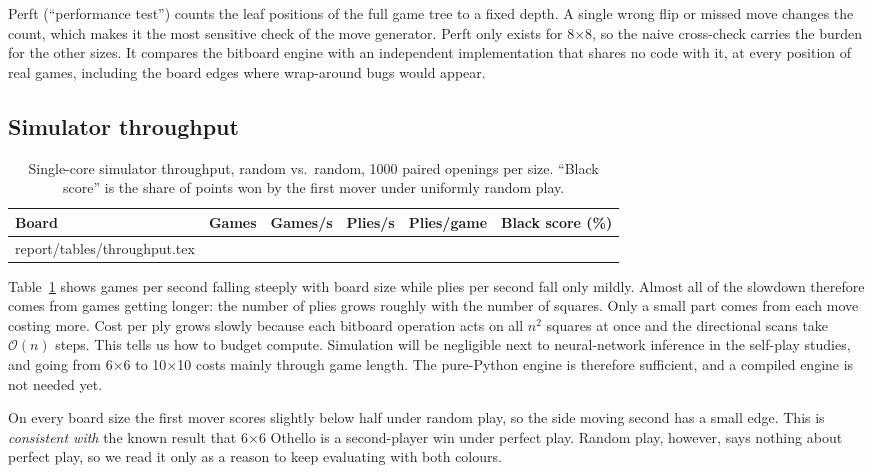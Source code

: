 \documentclass[11pt]{article}
\makeatletter
\newcommand{\bx}[1]{#1$\times$#1}
\newcommand{\tabinput}[1]{\@@input #1 }
\makeatother
\begin{document}
Perft (``performance test'') counts the leaf positions of the full game tree to
a fixed depth. A single wrong flip or missed move changes the count, which makes
it the most sensitive check of the move generator. Perft only exists for
\bx{8}, so the naive cross-check carries the burden for the other sizes. It
compares the bitboard engine with an independent implementation that shares no
code with it, at every position of real games, including the board edges where
wrap-around bugs would appear.

\subsection{Simulator throughput}

\begin{table}[H]
\centering
\caption{Single-core simulator throughput, random vs.\ random, 1000 paired
openings per size. ``Black score'' is the share of points won by the first
mover under uniformly random play.}
\label{tab:throughput}
\begin{tabular}{@{}lrrrrr@{}}
\toprule
Board & Games & Games/s & Plies/s & Plies/game & Black score (\%) \\
\midrule
\tabinput{report/tables/throughput.tex}
\bottomrule
\end{tabular}
\end{table}

Table~\ref{tab:throughput} shows games per second falling steeply with board
size while plies per second fall only mildly. Almost all of the slowdown
therefore comes from games getting longer: the number of plies grows roughly with
the number of squares. Only a small part comes from each move costing more. Cost
per ply grows slowly because each bitboard operation acts on all $n^2$ squares
at once and the directional scans take $\mathcal{O}(n)$ steps. This tells us how
to budget compute. Simulation will be negligible next to neural-network
inference in the self-play studies, and going from \bx{6} to \bx{10} costs
mainly through game length. The pure-Python engine is therefore sufficient, and
a compiled engine is not needed yet.

On every board size the first mover scores slightly below half under random
play, so the side moving second has a small edge. This is \emph{consistent
with} the known result that \bx{6} Othello is a second-player win under
perfect play. Random play, however, says nothing about perfect play, so we
read it only as a reason to keep evaluating with both colours.
\end{document}
